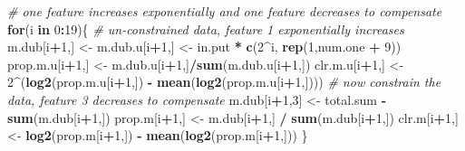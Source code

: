 \documentclass[onecolumn]{book}
\newenvironment{Shaded}{\begin{snugshade}}{\end{snugshade}}
\newcommand{\CommentTok}[1]{\textcolor[rgb]{0.56,0.35,0.01}{\textit{#1}}}
\newcommand{\ControlFlowTok}[1]{\textcolor[rgb]{0.13,0.29,0.53}{\textbf{#1}}}
\newcommand{\DecValTok}[1]{\textcolor[rgb]{0.00,0.00,0.81}{#1}}
\newcommand{\KeywordTok}[1]{\textcolor[rgb]{0.13,0.29,0.53}{\textbf{#1}}}
\newcommand{\NormalTok}[1]{#1}
\newcommand{\OperatorTok}[1]{\textcolor[rgb]{0.81,0.36,0.00}{\textbf{#1}}}
\newcommand{\StringTok}[1]{\textcolor[rgb]{0.31,0.60,0.02}{#1}}
\theoremstyle{definition}
\theoremstyle{definition}
\theoremstyle{definition}
\theoremstyle{remark}
\begin{document}
\begin{Shaded}
\begin{Highlighting}[]
\CommentTok{# one feature increases exponentially and one feature decreases to compensate}
\ControlFlowTok{for}\NormalTok{(i }\ControlFlowTok{in} \DecValTok{0}\OperatorTok{:}\DecValTok{19}\NormalTok{)\{}
    \CommentTok{# un-constrained data, feature 1 exponentially increases}
\NormalTok{    m.dub[i}\OperatorTok{+}\DecValTok{1}\NormalTok{,] <-}\StringTok{ }\NormalTok{m.dub.u[i}\OperatorTok{+}\DecValTok{1}\NormalTok{,] <-}\StringTok{ }\NormalTok{in.put }\OperatorTok{*}\StringTok{ }\KeywordTok{c}\NormalTok{(}\DecValTok{2}\OperatorTok{^}\NormalTok{i, }\KeywordTok{rep}\NormalTok{(}\DecValTok{1}\NormalTok{,num.one }\OperatorTok{+}\StringTok{ }\DecValTok{9}\NormalTok{))}
\NormalTok{    prop.m.u[i}\OperatorTok{+}\DecValTok{1}\NormalTok{,] <-}\StringTok{ }\NormalTok{m.dub.u[i}\OperatorTok{+}\DecValTok{1}\NormalTok{,]}\OperatorTok{/}\KeywordTok{sum}\NormalTok{(m.dub.u[i}\OperatorTok{+}\DecValTok{1}\NormalTok{,])}
\NormalTok{    clr.m.u[i}\OperatorTok{+}\DecValTok{1}\NormalTok{,] <-}\StringTok{ }\DecValTok{2}\OperatorTok{^}\NormalTok{(}\KeywordTok{log2}\NormalTok{(prop.m.u[i}\OperatorTok{+}\DecValTok{1}\NormalTok{,]) }\OperatorTok{-}\StringTok{ }\KeywordTok{mean}\NormalTok{(}\KeywordTok{log2}\NormalTok{(prop.m.u[i}\OperatorTok{+}\DecValTok{1}\NormalTok{,])))}
    \CommentTok{# now constrain the data, feature 3 decreases to compensate}
\NormalTok{    m.dub[i}\OperatorTok{+}\DecValTok{1}\NormalTok{,}\DecValTok{3}\NormalTok{] <-}\StringTok{ }\NormalTok{total.sum }\OperatorTok{-}\StringTok{ }\KeywordTok{sum}\NormalTok{(m.dub[i}\OperatorTok{+}\DecValTok{1}\NormalTok{,])}
\NormalTok{    prop.m[i}\OperatorTok{+}\DecValTok{1}\NormalTok{,] <-}\StringTok{ }\NormalTok{m.dub[i}\OperatorTok{+}\DecValTok{1}\NormalTok{,] }\OperatorTok{/}\StringTok{ }\KeywordTok{sum}\NormalTok{(m.dub[i}\OperatorTok{+}\DecValTok{1}\NormalTok{,])}
\NormalTok{    clr.m[i}\OperatorTok{+}\DecValTok{1}\NormalTok{,] <-}\StringTok{ }\KeywordTok{log2}\NormalTok{(prop.m[i}\OperatorTok{+}\DecValTok{1}\NormalTok{,]) }\OperatorTok{-}\StringTok{ }\KeywordTok{mean}\NormalTok{(}\KeywordTok{log2}\NormalTok{(prop.m[i}\OperatorTok{+}\DecValTok{1}\NormalTok{,]))}
\NormalTok{\}}
\end{Highlighting}
\end{Shaded}
\end{document}

